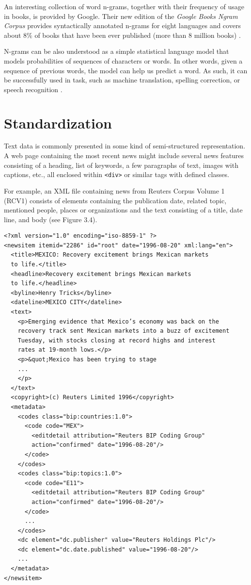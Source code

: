 An interesting collection of word n-grams, together with their frequency of
usage in books, is provided by Google. Their new edition of the \textit{Google Books
Ngram Corpus} provides syntactically annotated n-grams for eight languages and
covers about 8\% of books that have been ever published (more than 8 million
books) \cite{ref172}.

N-grams can be also understood as a simple statistical language model that
models probabilities of sequences of characters or words. In other words, given
a sequence of previous words, the model can help us predict a word. As such, it
can be successfully used in task, such as machine translation, spelling correction,
or speech recognition \cite{ref138}.

\section{Standardization}

Text data is commonly presented in some kind of semi-structured representation.
A web page containing the most recent news might include several news features
consisting of a heading, list of keywords, a few paragraphs of text, images with
captions, etc., all enclosed within \texttt{<div>} or similar tags with defined classes.

For example, an XML file containing news from Reuters Corpus Volume 1
(RCV1) \cite{ref167} consists of elements containing the publication date, related topic, mentioned people, places or organizations and the text consisting of a title, date
line, and body (see Figure 3.4).

\begin{verbatim}
<?xml version="1.0" encoding="iso-8859-1" ?>
<newsitem itemid="2286" id="root" date="1996-08-20" xml:lang="en">
  <title>MEXICO: Recovery excitement brings Mexican markets
  to life.</title>
  <headline>Recovery excitement brings Mexican markets
  to life.</headline>
  <byline>Henry Tricks</byline>
  <dateline>MEXICO CITY</dateline>
  <text>
    <p>Emerging evidence that Mexico’s economy was back on the
    recovery track sent Mexican markets into a buzz of excitement
    Tuesday, with stocks closing at record highs and interest
    rates at 19-month lows.</p>
    <p>&quot;Mexico has been trying to stage
    ...
    </p>
  </text>
  <copyright>(c) Reuters Limited 1996</copyright>
  <metadata>
    <codes class="bip:countries:1.0">
      <code code="MEX">
        <editdetail attribution="Reuters BIP Coding Group"
        action="confirmed" date="1996-08-20"/>
      </code>
    </codes>
    <codes class="bip:topics:1.0">
      <code code="E11">
        <editdetail attribution="Reuters BIP Coding Group"
        action="confirmed" date="1996-08-20"/>
      </code>
      ...
    </codes>
    <dc element="dc.publisher" value="Reuters Holdings Plc"/>
    <dc element="dc.date.published" value="1996-08-20"/>
    ...
  </metadata>
</newsitem>
\end{verbatim}

